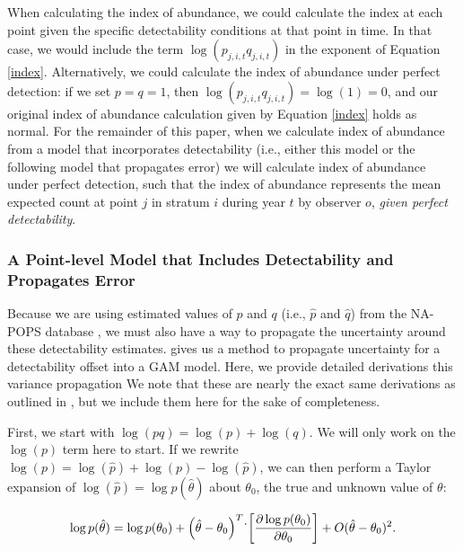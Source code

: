 \par When calculating the index of abundance, we could calculate the index at each point given the specific detectability conditions at that point in time.
In that case, we would include the term $\log(p_{j,i,t}q_{j,i,t})$ in the exponent of Equation \ref{index}.
Alternatively, we could calculate the index of abundance under perfect detection: if we set $p = q = 1$, then $\log(p_{j,i,t}q_{j,i,t}) = \log(1) = 0$, and our original index of abundance calculation given by Equation \ref{index} holds as normal.
For the remainder of this paper, when we calculate index of abundance from a model that incorporates detectability (i.e., either this model or the following model that propagates error) we will calculate index of abundance under perfect detection, such that the index of abundance represents the mean expected count at point $j$ in stratum $i$ during year $t$ by observer $o$, \textit{given perfect detectability}.

\subsubsection{A Point-level Model that Includes Detectability and Propagates Error}\label{varprop-text}

\par Because we are using estimated values of $p$ and $q$ (i.e., $\hat{p}$ and $\hat{q}$) from the NA-POPS database \citep{edwards_point_2023}, we must also have a way to propagate the uncertainty around these detectability estimates. 
\citet{bravington_variance_2021} gives us a method to propagate uncertainty for a detectability offset into a GAM model. 
Here, we provide detailed derivations this variance propagation
We note that these are nearly the exact same derivations as outlined in \citet{bravington_variance_2021}, but we include them here for the sake of completeness.

\par First, we start with $\log(pq) = \log(p) + \log(q)$.
We will only work on the $\log(p)$ term here to start. 
If we rewrite $\log(p) = \log(\hat{p}) + \log(p) - \log(\hat{p})$, we can then perform a Taylor expansion of $\log(\hat{p}) = \log p(\hat{\theta})$ about $\theta_0$, the true and unknown value of $\theta$:

$$\log p(\hat{\theta}) = \log p(\theta_0) + \left( \hat{\theta} - \theta_0 \right)^T \dot \\ \left[ \dfrac{\partial \log p({\theta_0})}{\partial {\theta_0}}  \right] + O(\hat{\theta} - \theta_0)^2. $$

